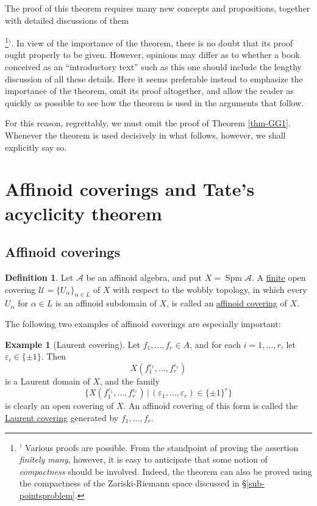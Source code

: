 \documentclass[a4paper,12pt, dvipdfmx]{jsbook}
\def\Spm{\mathop{\mathrm{Spm}}\nolimits}
\theoremstyle{plain}
\theoremstyle{definition}
\newtheorem{dfn}[thm]{\bfseries Definition}
\newtheorem{exa}[thm]{\bfseries Example}
\newcounter{chushaku}
\def\chu#1{\addtocounter{chushaku}{1}\footnote[\value{chushaku}]{${}^)$ #1}${}^)$}
\begin{document}
The proof of this theorem requires many new concepts and propositions, together with detailed discussions of them\chu{Various proofs are possible. From the standpoint of proving the assertion {\it finitely many}, however, it is easy to anticipate that some notion of {\it compactness} should be involved. Indeed, the theorem can also be proved using the compactness of the Zariski-Riemann space discussed in \S\ref{sub-pointsproblem}.}.
In view of the importance of the theorem, there is no doubt that its proof ought properly to be given.
However, opinions may differ as to whether a book conceived as an ``introductory text'' such as this one should include the lengthy discussion of all these details.
Here it seems preferable instead to emphasize the importance of the theorem, omit its proof altogether, and allow the reader as quickly as possible to see how the theorem is used in the arguments that follow.

For this reason, regrettably, we must omit the proof of Theorem \ref{thm-GG1}. Whenever the theorem is used decisively in what follows, however, we shall explicitly say so.

\section{Affinoid coverings and Tate's acyclicity theorem}\label{sec-Tateacyclicity}
\subsection{Affinoid coverings}\label{sub-affinoidcoverings}
\begin{dfn}\label{dfn-affinoidcoverings}{\rm 
Let $\mathcal{A}$ be an affinoid algebra, and put $X=\Spm\mathcal{A}$.
A \underline{finite} open covering $\mathcal{U}=\{U_{\alpha}\}_{\alpha\in L}$ of $X$ with respect to the wobbly topology, in which every $U_{\alpha}$ for $\alpha\in L$ is an affinoid subdomain of $X$, is called an \underline{affinoid covering} of $X$.}
\end{dfn}

The following two examples of affinoid coverings are especially important:
\begin{exa}[Laurent covering]\label{exa-Laurentcovering}{\rm 
{}
Let $f_1,\ldots,f_r\in A$, and for each $i=1,\ldots,r$, let $\varepsilon_i\in\{\pm 1\}$.
Then
$$
X(f^{\varepsilon_1}_1,\ldots,f^{\varepsilon_r}_r)
$$
is a Laurent domain of $X$, and the family
$$
\{X(f^{\varepsilon_1}_1,\ldots,f^{\varepsilon_r}_r)\,|\,(\varepsilon_1,\ldots,\varepsilon_r)\in\{\pm 1\}^r\}
$$
is clearly an open covering of $X$.
An affinoid covering of this form is called the \underline{Laurent covering} generated by $f_1,\ldots,f_r$.}
\end{exa}
\end{document}
